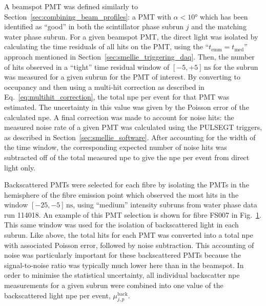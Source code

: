 A beamspot PMT was defined similarly to Section~\ref{sec:combining_beam_profiles}: a PMT with $\alpha<\ang{10}$ which has been identified as ``good'' in both the scintillator phase subrun $j$ and the matching water phase subrun. %
For a given beamspot PMT, the direct light was isolated by calculating the time residuals of all hits on the PMT, using the ``$t_{\mathrm{emm}} = t_{\mathrm{med}}$'' approach mentioned in Section~\ref{sec:smellie_triggering_daq}. %
Then, the number of hits observed in a ``tight'' time residual window of $[-5,+5]\,\si{\ns}$ for the subrun was measured for a given subrun for the PMT of interest. %
By converting to occupancy and then using a multi-hit correction as described in Eq.~\ref{eq:multihit_correction}, the total npe per event for that PMT was estimated. The uncertainty in this value was given by the Poisson error of the calculated npe. A final correction was made to account for noise hits: the measured noise rate of a given PMT was calculated using the PULSEGT triggers, as described in Section~\ref{sec:smellie_software}. After accounting for the width of the time window, the corresponding expected number of noise hits was subtracted off of the total measured npe to give the npe per event from direct light only.

Backscattered PMTs were selected for each fibre by isolating the PMTs in the hemisphere of the fibre emission point which observed the most hits in the \tres{} window $[-25,-5]\,\si{\ns}$, using ``medium'' intensity subruns from water phase data run \num{114018}. %
An example of this PMT selection is shown for fibre FS007 in Fig.~\ref{fig:smellie_backscat_PMT_selection}. This same \tres{} window was used for the isolation of backscattered light in each subrun. Like above, the total hits for each PMT was converted into a total npe with associated Poisson error, followed by noise subtraction. This accounting of noise was particularly important for these backscattered PMTs because the signal-to-noise ratio was typically much lower here than in the beamspot. In order to minimise the statistical uncertainty, all individual backscatter npe measurements for a given subrun were combined into one value of the backscattered light npe per event, $\mu_{j,p}^{\mathrm{back}}$. 

\begin{figure}
    \centering
    \caption[]{}
    \label{fig:smellie_backscat_PMT_selection}
\end{figure}

